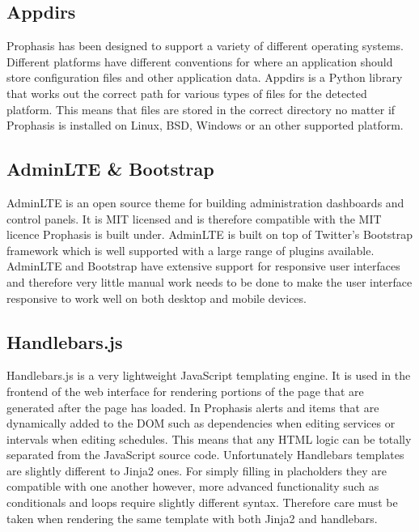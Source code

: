 \documentclass[bsc,deptreport,twoside,parskip,singlespacing,notimes]{infthesis}
\begin{document}
\subsection{Appdirs}

	Prophasis has been designed to support a variety of different operating
	systems.  Different platforms have different conventions for where an
	application should store configuration files and other application data.
	Appdirs is a Python library that works out the correct path for various types
	of files for the detected platform.  This means that files are stored in the
	correct directory no matter if Prophasis is installed on Linux, BSD, Windows
	or an other supported platform.

\subsection{AdminLTE \& Bootstrap}

	AdminLTE is an open source theme for building administration dashboards and
	control panels.  It is MIT licensed and is therefore compatible with the MIT
	licence Prophasis is built under.  AdminLTE is built on top of Twitter's
	Bootstrap framework which is well supported with a large range of plugins
	available.  AdminLTE and Bootstrap have extensive support for responsive user
	interfaces and therefore very little manual work needs to be done to make the
	user interface responsive to work well on both desktop and mobile devices.

\subsection{Handlebars.js}

	Handlebars.js is a very lightweight JavaScript templating engine.  It is used
	in the frontend of the web interface for rendering portions of the page that
	are generated after the page has loaded. In Prophasis alerts and items that are
	dynamically added to the DOM such as dependencies when editing services or
	intervals when editing schedules.  This means that any HTML logic can be
	totally separated from the JavaScript source code.  Unfortunately Handlebars
	templates are slightly different to Jinja2 ones.  For simply filling in
	placholders they are compatible with one another however, more advanced
	functionality such as conditionals and loops require slightly different syntax.
	Therefore care must be taken when rendering the same template with both Jinja2
	and handlebars.
	
\end{document}
